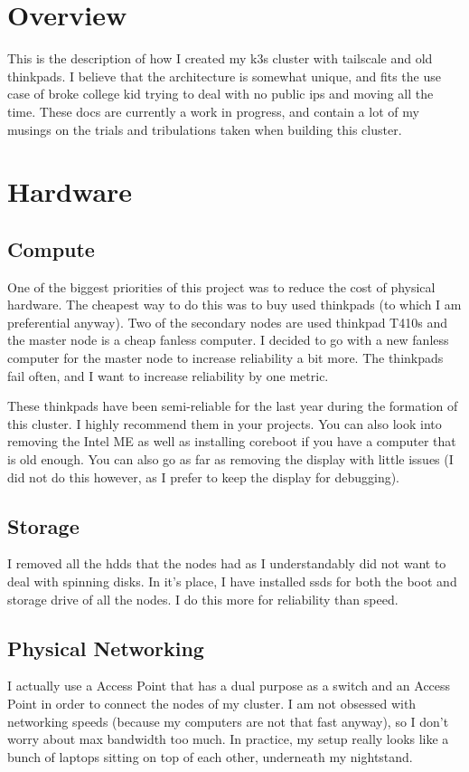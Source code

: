 \documentclass[12pt]{article}
\begin{document}
\section{Overview}
This is the description of how I created my k3s cluster with tailscale and old thinkpads. I believe that the architecture is somewhat unique, and fits the use case of broke college kid trying to deal with no public ips and moving all the time. These docs are currently a work in progress, and contain a lot of my musings on the trials and tribulations taken when building this cluster.

\section{Hardware}
\subsection{Compute}
One of the biggest priorities of this project was to reduce the cost of physical hardware. The cheapest way to do this was to buy used thinkpads (to which I am preferential anyway). Two of the secondary nodes are used thinkpad T410s and the master node is a cheap fanless computer. I decided to go with a new fanless computer for the master node to increase reliability a bit more. The thinkpads fail often, and I want to increase reliability by one metric.

These thinkpads have been semi-reliable for the last year during the formation of this cluster. I highly recommend them in your projects. You can also look into removing the Intel ME as well as installing coreboot if you have a computer that is old enough. You can also go as far as removing the display with little issues (I did not do this however, as I prefer to keep the display for debugging).

\subsection{Storage}
I removed all the hdds that the nodes had as I understandably did not want to deal with spinning disks. In it's place, I have installed ssds for both the boot and storage drive of all the nodes. I do this more for reliability than speed.

\subsection{Physical Networking}
I actually use a Access Point that has a dual purpose as a switch and an Access Point in order to connect the nodes of my cluster. I am not obsessed with networking speeds (because my computers are not that fast anyway), so I don't worry about max bandwidth too much. In practice, my setup really looks like a bunch of laptops sitting on top of each other, underneath my nightstand.
\end{document}
